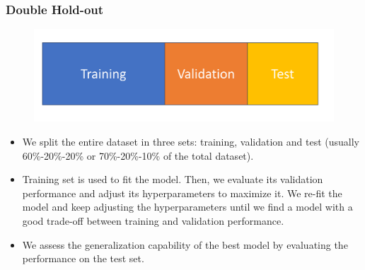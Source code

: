 \documentclass{beamer}
\begin{document}
	\begin{frame}
		\frametitle{Double Hold-out}
		\begin{figure}
			\centering
			\includegraphics[scale=0.3]{images/hold-out}
		\end{figure}
		\begin{itemize}
			\item We split the entire dataset in three sets: training, validation and test (usually 60\%-20\%-20\% or  70\%-20\%-10\% of the total dataset). 
			\item Training set is used to fit the model. Then, we evaluate its validation performance and adjust its hyperparameters to maximize it. We re-fit the model and keep adjusting the hyperparameters until we find a model with a good trade-off between training and validation performance.
			\item We assess the generalization capability of the best model by evaluating the performance on the test set.
		\end{itemize}	
	\end{frame}
\end{document}
